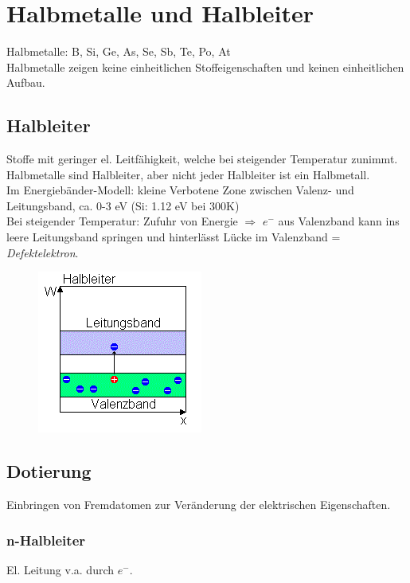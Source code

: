 \section{Halbmetalle und Halbleiter}
Halbmetalle: B, Si, Ge, As, Se, Sb, Te, Po, At \\

Halbmetalle zeigen keine einheitlichen Stoffeigenschaften und keinen einheitlichen Aufbau. \\

\subsection{Halbleiter}
Stoffe mit geringer el. Leitfähigkeit, welche bei steigender Temperatur zunimmt. Halbmetalle sind Halbleiter, aber nicht jeder Halbleiter ist ein Halbmetall. \\

Im Energiebänder-Modell: kleine Verbotene Zone zwischen Valenz- und Leitungsband, ca. 0-3 eV (Si: 1.12 eV bei 300K) \\

Bei steigender Temperatur: Zufuhr von Energie $\Rightarrow$ $e^-$ aus Valenzband kann ins leere Leitungsband springen und hinterlässt Lücke im Valenzband = \emph{Defektelektron}.

\begin{figure}[htbp]
	\centering
	\includegraphics[width=0.4\linewidth]{images/4_Halbleiter_Energiebaender.png}
\end{figure}

\subsection{Dotierung}
Einbringen von Fremdatomen zur Veränderung der elektrischen Eigenschaften.

\subsubsection{n-Halbleiter}
El. Leitung v.a. durch $e^-$. \\

